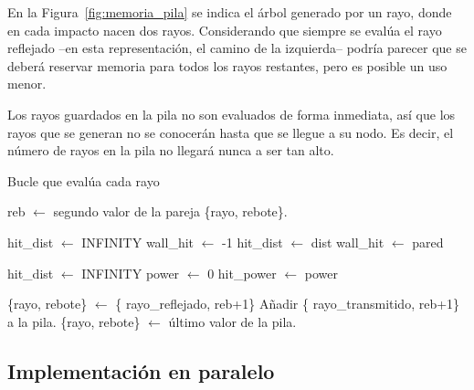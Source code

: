 %     

En la Figura~\ref{fig:memoria_pila} se indica el árbol generado por un rayo, donde en cada impacto nacen dos rayos.
Considerando que siempre se evalúa el rayo reflejado --en esta representación, el camino de la izquierda-- podría parecer que se deberá reservar memoria para todos los rayos restantes, pero es posible un uso menor.

Los rayos guardados en la pila no son evaluados de forma inmediata, así que los rayos que se generan no se conocerán hasta que se llegue a su nodo.
Es decir, el número de rayos en la pila no llegará nunca a ser tan alto.


\begin{algorithm}
    \caption{Bucle que evalúa cada rayo}
    \label{euclid}
    \begin{algorithmic}[1]
        
            \State reb $\gets$ segundo valor de la pareja \{rayo, rebote\}.

                \State hit\_dist $\gets$ INFINITY
                \State wall\_hit $\gets$ -1
                        \State hit\_dist $\gets$ dist
                        \State wall\_hit $\gets$ pared
                    \EndIf
                \EndIf
            \EndFor

                \State hit\_dist $\gets$ INFINITY
                \State power $\gets$ 0
                        \State hit\_power $\gets$ power
                    \EndIf
                \EndIf
            \EndFor

                \State \{rayo, rebote\} $\gets$ \{ rayo\_reflejado, reb+1\}
                \State Añadir \{ rayo\_transmitido, reb+1\} a la pila.
            \Else
                \State \{rayo, rebote\} $\gets$ último valor de la pila.
            \EndIf
        \EndWhile
    \end{algorithmic}
\end{algorithm}

\subsection{Implementación en paralelo}

